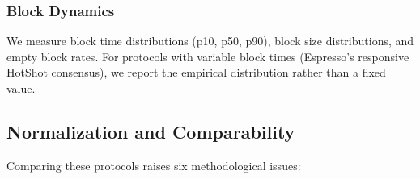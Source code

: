 \subsubsection{Block Dynamics}

We measure block time distributions (p10, p50, p90), block size distributions, and empty block rates.
For protocols with variable block times (Espresso's responsive HotShot consensus), we report the empirical distribution rather than a fixed value.

\subsection{Normalization and Comparability}
\label{sec:meth-normalization}

Comparing these protocols raises six methodological issues:

